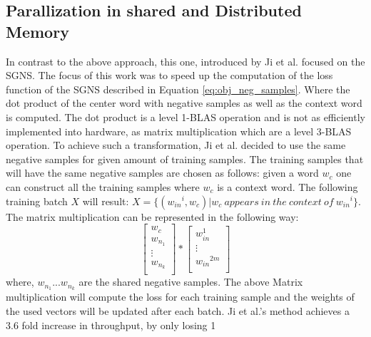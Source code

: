\subsection{Parallization in shared and Distributed Memory}
In contrast to the above approach, this one, introduced by Ji et al. \cite{intel} focused on the SGNS. The focus of this work was to speed up the computation of the loss function of the SGNS described in Equation \ref{eq:obj_neg_samples}. Where the dot product of the center word  with negative samples as well as the context word is computed. The dot product is a level 1-BLAS operation and is not as efficiently implemented into hardware, as matrix multiplication which are a level 3-BLAS operation.  To achieve such a transformation, Ji et al. decided to use the same negative samples for given amount of training samples. The training samples that will have the same negative samples are chosen as follows: given a word $w_c$ one can construct all the training samples where $w_c$ is a context word. The following training batch $X$ will result: $X = \{({w_{in}}^i, w_c) | w_c~appears~in~the~context~of~{w_{in}}^i\}$. The matrix multiplication can be represented in the following way:
\[
\begin{bmatrix}
w_c \\
w_{n_1} \\
\vdots \\
w_{n_k}\\
\end{bmatrix}
*
\begin{bmatrix}
w_{in}^1\\
\vdots\\
{w_{in}}^{2m}\\
\end{bmatrix}
\]
where, $w_{n_1}...w_{n_k}$ are the shared negative samples. The above Matrix multiplication will compute the loss for each training sample and the weights of the used vectors will be updated after each batch. Ji et al.'s method achieves a 3.6 fold increase in throughput, by only losing 1\ %

